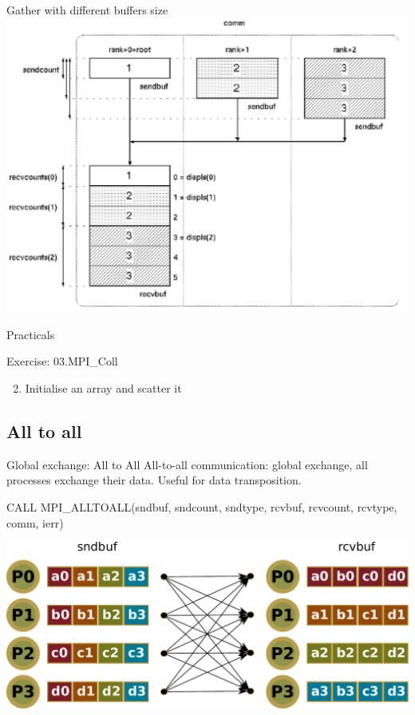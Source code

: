 \documentclass[aspectratio=43]{beamer}
\begin{document}
\begin{frame}{Gather with different buffers size}
\includegraphics[scale=0.5]{03.MPI_Coll/gather2.pdf}
\end{frame}

\begin{frame}{Practicals}
    \begin{brown2block}{Exercise: 03.MPI\_Coll}
    \begin{enumerate}
        \setcounter{enumi}{1}
        \item Initialise an array and scatter it
    \end{enumerate}
    \end{brown2block}
\end{frame}


\subsection{All to all}
\begin{frame}[fragile]{Global exchange: All to All}
All-to-all communication: global exchange, all processes exchange their data. Useful for data transposition.\\
\begin{Fortranlisting}[]{}
CALL MPI_ALLTOALL(sndbuf, sndcount, sndtype,
                  rcvbuf, rcvcount, rcvtype, comm, ierr)
\end{Fortranlisting}
\begin{center}
\includegraphics[scale=0.5]{03.MPI_Coll/alltoall.pdf}
\end{center}
\end{frame}
\end{document}
